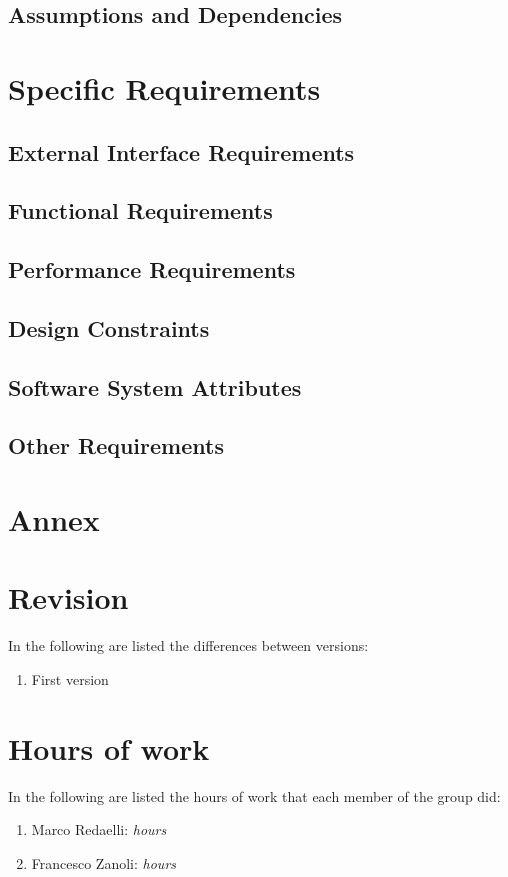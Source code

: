 \documentclass[]{report}
\begin{document}
\section{Assumptions and Dependencies}

\chapter{Specific Requirements}
\section{External Interface Requirements }

\section{Functional Requirements}


\section{Performance Requirements}
\section{Design Constraints}
\section{Software System Attributes }
\section{Other Requirements}

\chapter{Annex}

\chapter*{Revision}
In the following are listed the differences between versions:
\begin{enumerate}
	\item First version
\end{enumerate}

\chapter*{Hours of work}
In the following are listed the hours of work that each member of the group did:
\begin{enumerate}
	\item Marco Redaelli:  \emph{hours}
	\item Francesco Zanoli: \emph{hours}
\end{enumerate}
\end{document}
